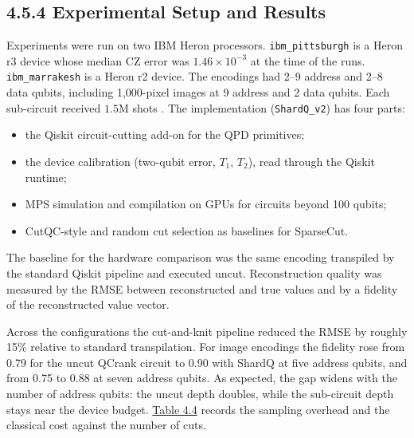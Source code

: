 \documentclass{report}
\theoremstyle{plain}
\theoremstyle{definition}
\theoremstyle{remark}
\begin{document}
\subsection{4.5.4 Experimental Setup and Results}\label{sec:qml:shardq:results}

Experiments were run on two IBM Heron processors. \texttt{ibm\_pittsburgh} is a Heron r3 device whose median CZ error was $1.46\times 10^{-3}$ at the time of the runs. \texttt{ibm\_marrakesh} is a Heron r2 device. The encodings had 2--9 address and 2--8 data qubits, including 1,000-pixel images at 9 address and 2 data qubits. Each sub-circuit received $1.5$M shots \cite{guo2025shardq}. The implementation (\texttt{ShardQ\_v2}) has four parts:
\begin{itemize}
\item the Qiskit circuit-cutting add-on for the QPD primitives;
\item the device calibration (two-qubit error, $T_1$, $T_2$), read through the Qiskit runtime;
\item MPS simulation and compilation on GPUs for circuits beyond 100 qubits;
\item CutQC-style and random cut selection as baselines for SparseCut.
\end{itemize}
The baseline for the hardware comparison was the same encoding transpiled by the standard Qiskit pipeline and executed uncut. Reconstruction quality was measured by the RMSE between reconstructed and true values and by a fidelity of the reconstructed value vector.

Across the configurations the cut-and-knit pipeline reduced the RMSE by roughly 15\% relative to standard transpilation. For image encodings the fidelity rose from 0.79 for the uncut QCrank circuit to 0.90 with ShardQ at five address qubits, and from 0.75 to 0.88 at seven address qubits. As expected, the gap widens with the number of address qubits: the uncut depth doubles, while the sub-circuit depth stays near the device budget. \hyperref[tab:qml:shardq-overhead]{Table 4.4} records the sampling overhead and the classical cost against the number of cuts.
\end{document}
